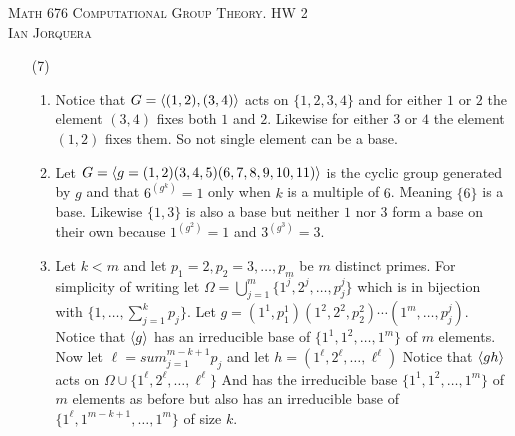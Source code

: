 \documentclass[12pt]{amsart}
\begin{document}
\begin{center}
   \textsc{Math 676 Computational Group Theory. HW 2\\ Ian Jorquera}
\end{center}
\vspace{1em}

\begin{itemize}
   \item[(7)] 
   \begin{enumerate}[label= (\alph*)]
      \item Notice that $G=\left\langle (1,2),(3,4) \right\rangle$ acts on $\{1,2,3,4\}$ and for either 
      $1$ or $2$ the element $(3,4)$ fixes both $1$ and $2$. Likewise for either 
      $3$ or $4$ the element $(1,2)$ fixes them. So not single element can be a base.

      \item Let $G=\left\langle g=(1,2)(3,4,5)(6,7,8,9,10,11) \right\rangle$ is the cyclic group generated 
      by $g$ and that $6^{(g^k)}=1$ only when $k$ is a multiple of $6$. Meaning 
      $\{6\}$ is a base. Likewise $\{1,3\}$ is also a base but neither $1$ nor $3$ 
      form a base on their own because $1^{(g^2)}=1$ and $3^{(g^3)}=3$.

      \item Let $k<m$ and let $p_1=2,p_2=3,\dots, p_m$ be $m$ distinct primes. For 
      simplicity of writing let $\Omega=\bigcup_{j=1}^m\{1^j,2^j,\dots,p_j^j\}$ 
      which is in bijection with $\{1,\dots, \sum_{j=1}^kp_j\}$. Let 
      $g=(1^1,p_1^1)(1^2,2^2,p_2^2)\cdots (1^m,\dots,p_j^j)$. Notice that $\left\langle g \right\rangle$ 
      has an irreducible base of $\{1^1,1^2,\dots, 1^m\}$ of $m$ elements. Now 
      let $\ell=sum_{j=1}^{m-k+1}p_j$ and let $h=(1^\ell,2^\ell,\dots,\ell^\ell)$
      Notice that $\left\langle gh \right\rangle$ acts on $\Omega\cup\{1^\ell,2^\ell,\dots,\ell^\ell\}$
      And has the irreducible base $\{1^1,1^2,\dots, 1^m\}$ of $m$ elements as before
      but also has an irreducible base of $\{1^\ell,1^{m-k+1},\dots, 1^m\}$ of size $k$.



\end{enumerate}
\end{itemize}
\end{document}
